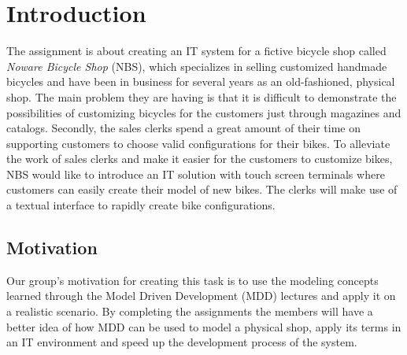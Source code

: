 \section{Introduction}
\label{sec.introduction}
\noindent The assignment is about creating an IT system for a fictive bicycle
shop called \emph{Noware Bicycle Shop} (NBS), which specializes in selling
customized handmade bicycles and have been in business for several years as an
old-fashioned, physical shop. The main problem they are having is that it is
difficult to demonstrate the possibilities of customizing bicycles for the
customers just through magazines and catalogs. Secondly, the sales clerks spend
a great amount of their time on supporting customers to choose valid
configurations for their bikes. To alleviate the work of sales clerks and make
it easier for the customers to customize bikes, NBS would like to introduce an
IT solution with touch screen terminals where customers can easily create their
model of new bikes. The clerks will make use of a textual interface to rapidly
create bike configurations.

\subsection{Motivation}
\noindent Our group's motivation for creating this task is to use the modeling
concepts learned through the Model Driven Development (MDD) lectures and apply
it on a realistic scenario. By completing the assignments the members will
have a better idea of how MDD can be used to model a physical shop, apply its
terms in an IT environment and speed up the development process of the system.

